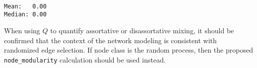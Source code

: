 \documentclass[11pt]{article}
\begin{document}
    \begin{center}
    \end{center}
    { \hspace*{\fill} \\}
    
    \begin{Verbatim}[commandchars=\\\{\}]
Mean:   0.00
Median: 0.00

    \end{Verbatim}

    When using $Q$ to quantify assortative or disassortative mixing,
it should be confirmed that the context of the network modeling is
consistent with randomized edge selection. If node class is the random
process, then the proposed \texttt{node\_modularity} calculation should
be used instead.


    
    
    
    
\end{document}
